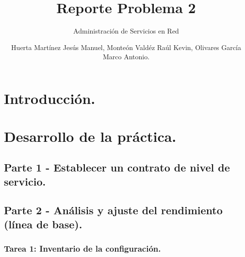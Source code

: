 \documentclass[oneside,10pt]{book}
\title{Reporte Problema 2}
\subtitle{Administración de Servicios en Red}
\author{Huerta Martínez Jesús Manuel, Monteón Valdéz Raúl Kevin, Olivares García Marco Antonio.}
\begin{document}
\maketitle
\thispagestyle{empty}

\frontmatter
\tableofcontents

\mainmatter


\chapter{Introducción.}



\chapter{Desarrollo de la práctica.}



\section{Parte 1 - Establecer un contrato de nivel de servicio.}



\section{Parte 2 - Análisis y ajuste del rendimiento (línea de base).}

\subsection{Tarea 1: Inventario de la configuración.}
\end{document}
